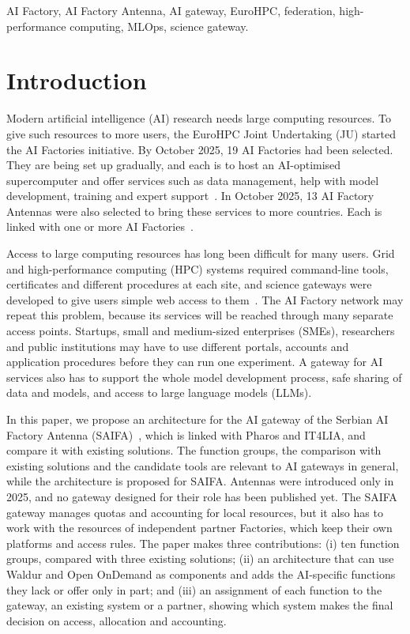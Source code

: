 \documentclass[conference,a4paper]{IEEEtran}
\DeclareRobustCommand{\roz}[1]{#1}
\DeclareRobustCommand{\nov}[1]{#1}
\DeclareRobustCommand{\tri}[1]{#1}
\DeclareRobustCommand{\fin}[1]{#1}
\begin{document}
\begin{IEEEkeywords}
AI Factory, AI Factory Antenna, AI gateway, EuroHPC, federation, high-performance computing, MLOps, science gateway.
\end{IEEEkeywords}

\section{Introduction}

Modern artificial intelligence (AI) research needs large computing resources. To give such resources to more users, the EuroHPC Joint Undertaking (JU) started the AI Factories initiative. By October 2025, 19 AI Factories had been selected. \nov{They are being set up gradually, and each is to host an AI-optimised supercomputer and offer} \roz{services such as data management, help with model development, training} and expert support~\cite{eurohpc_aif,eurohpc_six_aif}. In October 2025, 13 AI Factory Antennas were also selected to bring these services to more countries. Each is linked with one or more AI Factories~\cite{eurohpc_antennas,eurohpc_antennas_page}.

\nov{Access to large computing resources has long been difficult for many users. Grid and high-performance computing (HPC) systems required command-line tools, certificates and different procedures at each site, and science gateways were developed to give users simple web access to them}~\cite{wilkinsdiehr2007,hudak2018ood}\nov{. The AI Factory network may repeat this problem, because its services will be reached through many separate access points. Startups, small and medium-sized enterprises (SMEs), researchers and public institutions may have to use different portals, accounts and application procedures before they can run one experiment. A gateway for AI services also has to support the whole model development process, safe sharing of data and models, and access to large language models (LLMs).}

\nov{In this paper, we propose an architecture for the AI gateway of the Serbian AI Factory Antenna (SAIFA)~\cite{cordis_saifa,saifa_d31}, which is linked with Pharos and IT4LIA, and compare it with existing solutions. The function groups, the comparison with existing solutions and the candidate tools are relevant to AI gateways in general, while the architecture is proposed for SAIFA. Antennas were introduced only in 2025, and \tri{no gateway designed for their role has been published yet}. The SAIFA gateway manages quotas and accounting for local resources, but it also has to work with the resources of independent partner Factories, which keep their own platforms and access rules. \fin{The paper makes three contributions: (i) ten function groups, compared with three existing solutions; (ii) an architecture that can use Waldur and Open OnDemand as components and adds the AI-specific functions they lack or offer only in part; and (iii) an assignment of each function to the gateway, an existing system or a partner, showing which system makes the final decision on access, allocation and accounting.}}
\end{document}
